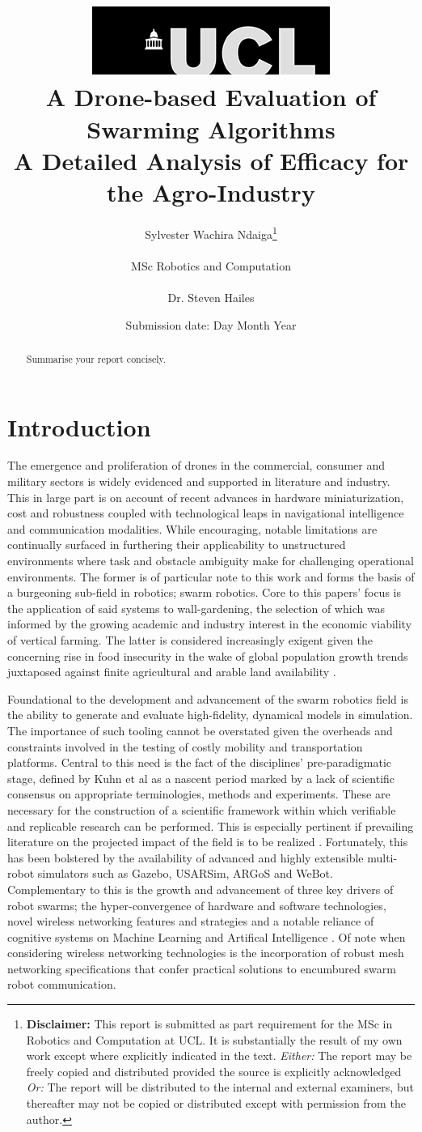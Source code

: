 \documentclass{report}
\title{  	{ \includegraphics[scale=.5]{ucl_logo.png} }\\
{{\Huge A Drone-based Evaluation of Swarming Algorithms}}\\
{\large A Detailed Analysis of Efficacy for the Agro-Industry}\\
		}
\date{Submission date: Day Month Year}
\author{Sylvester Wachira Ndaiga\thanks{
{\bf Disclaimer:}
This report is submitted as part requirement for the MSc in Robotics and Computation at UCL. It is
substantially the result of my own work except where explicitly indicated in the text.
\emph{Either:} The report may be freely copied and distributed provided the source is explicitly acknowledged
\newline  %
\emph{Or:}\newline
The report will be distributed to the internal and external examiners, but thereafter may not be copied or distributed except with permission from the author.}
\\ \\
MSc Robotics and Computation\\ \\
Dr. Steven Hailes}
\begin{document}
 
\onehalfspacing
\maketitle
\begin{abstract}
Summarise your report concisely.
\end{abstract}
\tableofcontents
\setcounter{page}{1}

\chapter{Introduction}

The emergence and proliferation of drones in the commercial, consumer and military sectors is widely evidenced and supported in literature and industry. This in large part is on account of recent advances in hardware miniaturization, cost and robustness coupled with technological leaps in navigational intelligence and communication modalities. While encouraging, notable limitations are continually surfaced in furthering their applicability to unstructured environments where task and obstacle ambiguity make for challenging operational environments. The former is of particular note to this work and forms the basis of a burgeoning sub-field in robotics; swarm robotics. Core to this papers' focus is the application of said systems to wall-gardening, the selection of which was informed by the growing academic and industry \cite{Gmi2017} interest in the economic viability of vertical farming. The latter is considered increasingly exigent given the concerning rise in food insecurity \cite{Yang2018} in the wake of global population growth trends juxtaposed against finite agricultural and arable land availability \cite{Banerjee2014}.

Foundational to the development and advancement of the swarm robotics field is the ability to generate and evaluate high-fidelity, dynamical models in simulation. The importance of such tooling cannot be overstated given the overheads and constraints involved in the testing of costly mobility and transportation platforms. Central to this need is the fact of the disciplines' pre-paradigmatic stage, defined by Kuhn et al \cite{Kuhn2015} as a nascent period marked by a lack of scientific consensus on appropriate terminologies, methods and experiments. These are necessary for the construction of a scientific framework within which verifiable and replicable research can be performed. This is especially pertinent if prevailing literature on the projected impact of the field is to be realized \cite{Yang2018}. Fortunately, this has been bolstered by the availability of advanced and highly extensible multi-robot simulators such as Gazebo, USARSim, ARGoS \cite{Pinciroli2014} and WeBot. Complementary to this is the growth and advancement of three key drivers of robot swarms; the hyper-convergence of hardware and software technologies, novel wireless networking features and strategies and a notable reliance of cognitive systems on Machine Learning and Artifical Intelligence \cite{Yang2018}. Of note when considering wireless networking technologies is the incorporation of robust mesh networking specifications \cite{Blue2018} that confer practical solutions to encumbured swarm robot communication.
\end{document}
